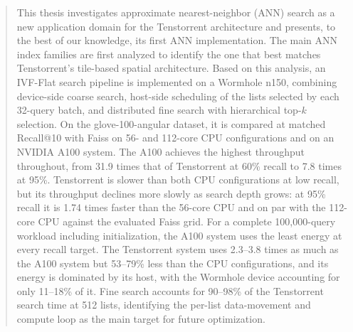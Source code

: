 \begin{abstract}
  This thesis investigates approximate nearest-neighbor (ANN) search as a new application domain for the Tenstorrent architecture and presents, to the best of our knowledge, its first ANN implementation.
  The main ANN index families are first analyzed to identify the one that best matches Tenstorrent's tile-based spatial architecture. Based on this analysis, an IVF-Flat search pipeline is implemented on a Wormhole n150, combining device-side coarse search, host-side scheduling of the lists selected by each 32-query batch, and distributed fine search with hierarchical top-\(k\) selection. On the glove-100-angular dataset, it is compared at matched Recall@10 with Faiss on 56- and 112-core CPU configurations and on an NVIDIA A100 system.
  The A100 achieves the highest throughput throughout, from 31.9 times that of Tenstorrent at 60\% recall to 7.8 times at 95\%. Tenstorrent is slower than both CPU configurations at low recall, but its throughput declines more slowly as search depth grows: at 95\% recall it is 1.74 times faster than the 56-core CPU and on par with the 112-core CPU against the evaluated Faiss grid. For a complete 100,000-query workload including initialization, the A100 system uses the least energy at every recall target. The Tenstorrent system uses 2.3--3.8 times as much as the A100 system but 53--79\% less than the CPU configurations, and its energy is dominated by its host, with the Wormhole device accounting for only 11--18\% of it. Fine search accounts for 90--98\% of the Tenstorrent search time at 512 lists, identifying the per-list data-movement and compute loop as the main target for future optimization.
\end{abstract}
